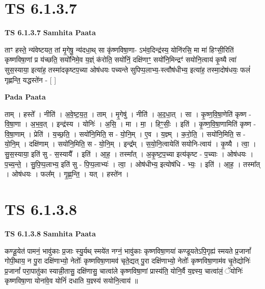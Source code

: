 \documentclass[17pt]{extarticle}
\begin{document}
\section{ TS 6.1.3.7 }

\textbf{TS 6.1.3.7 } \newline
\textbf{Samhita Paata} \newline

ताꣳ हस्ते॒ न्य॑वेष्टयत॒ तां मृ॒गेषु॒ न्य॑दधा॒थ् सा कृ॑ष्णविषा॒णा- ऽभ॑व॒दिन्द्र॑स्य॒ योनि॑रसि॒ मा मा॑ हिꣳसी॒रिति॑ कृष्णविषा॒णां प्र य॑च्छति॒ सयो॑निमे॒व य॒ज्ञ्ं क॑रोति॒ सयो॑निं॒ दक्षि॑णाꣳ॒॒ सयो॑नि॒मिन्द्रꣳ॑ सयोनि॒त्वाय॑ कृ॒ष्यै त्वा॑ सुस॒स्याया॒ इत्या॑ह॒ तस्मा॑दकृष्टप॒च्या ओष॑धयः पच्यन्ते सुपिप्प॒लाभ्य॒-स्त्वौष॑धीभ्य॒ इत्या॑ह॒ तस्मा॒दोष॑धयः॒ फलं॑ गृह्णन्ति॒ यद्धस्ते॑न - [  ] \newline

\textbf{Pada Paata} \newline

ताम् । हस्ते᳚ । नीति॑ । अ॒वे॒ष्ट॒य॒त॒ । ताम् । मृ॒गेषु॑ । नीति॑ । अ॒द॒धा॒त् । सा । कृ॒ष्ण॒वि॒षा॒णेति॑ कृष्ण - वि॒षा॒णा । अ॒भ॒व॒त् । इन्द्र॑स्य । योनिः॑ । अ॒सि॒ । मा । मा॒ । हिꣳ॒॒सीः॒ । इति॑ । कृ॒ष्ण॒वि॒षा॒णामिति॑ कृष्ण - वि॒षा॒णाम् । प्रेति॑ । य॒च्छ॒ति॒ । सयो॑नि॒मिति॒ स - यो॒नि॒म् । ए॒व । य॒ज्ञ्म् । क॒रो॒ति॒ । सयो॑नि॒मिति॒ स - यो॒नि॒म् । दक्षि॑णाम् । सयो॑नि॒मिति॒ स - यो॒नि॒म् । इन्द्र᳚म् । स॒यो॒नि॒त्वायेति॑ सयोनि-त्वाय॑ । कृ॒ष्यै । त्वा॒ । सु॒स॒स्याया॒ इति॑ सु - स॒स्यायै᳚ । इति॑ । आ॒ह॒ । तस्मा᳚त् । अ॒कृ॒ष्ट॒प॒च्या इत्य॑कृष्ट - प॒च्याः । ओष॑धयः । प॒च्य॒न्ते॒ । सु॒पि॒प्प॒लाभ्य॒ इति॑ सु - पि॒प्प॒लाभ्यः॑ । त्वा॒ । ओष॑धीभ्य॒ इत्योष॑धि - भ्यः॒ । इति॑ । आ॒ह॒ । तस्मा᳚त् । ओष॑धयः । फल᳚म् । गृ॒ह्ण॒न्ति॒ । यत् । हस्ते॑न ।  \newline





\section{ TS 6.1.3.8 }

\textbf{TS 6.1.3.8 } \newline
\textbf{Samhita Paata} \newline

कण्डू॒येत॑ पामनं॒ भावु॑काः प्र॒जाः स्यु॒र्यथ् स्मये॑त नग्नं॒ भावु॑काः कृष्णविषा॒णया॑ कण्डूयतेऽपि॒गृह्य॑ स्मयते प्र॒जानां᳚ गोपी॒थाय॒ न पु॒रा दक्षि॑णाभ्यो॒ नेतोः᳚ कृष्णविषा॒णामव॑ चृते॒द्यत् पु॒रा दक्षि॑णाभ्यो॒ नेतोः᳚ कृष्णविषा॒णाम॑व चृ॒तेद्योनिः॑ प्र॒जानां᳚ परा॒पातु॑का स्यान्नी॒तासु॒ दक्षि॑णासु॒ चात्वा॑ले कृष्णविषा॒णां प्रास्य॑ति॒ योनि॒र्वै य॒ज्ञ्स्य॒ चात्वा॑लं॒ ॅयोनिः॑ कृष्णविषा॒णा योना॑वे॒व योनिं॑ दधाति य॒ज्ञ्स्य॑ सयोनि॒त्वाय॑ ॥ \newline
\end{document}
